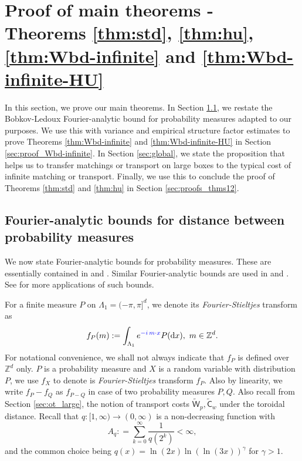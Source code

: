 \documentclass[12pt]{article}
\newcommand{\Z}{\mathbb{Z}}
\newcommand{\1}{\mathbf{1}}
\newcommand{\md}{\mathrm{d}}
\newcommand{\dy}[1]{\textcolor{blue}{#1}}
\newcommand{\dy}[1]{#1}%
\begin{document}
{{{{\section{Proof of main theorems - Theorems \ref{thm:std}, \ref{thm:hu}, \ref{thm:Wbd-infinite} and \ref{thm:Wbd-infinite-HU}}
\label{sec:proofs}

{In this section, we prove our main theorems. In Section \ref{sec:fourierprobbounds}, we restate the Bobkov-Ledoux Fourier-analytic bound for probability measures adapted to our purposes. We use this with variance and empirical structure factor estimates to prove Theorems \ref{thm:Wbd-infinite} and \ref{thm:Wbd-infinite-HU} in Section \ref{sec:proof_Wbd-infinite}. In Section \ref{sec:global}, we state the proposition that helps us to transfer matchings or transport on large boxes to the typical cost of infinite matching or transport. Finally, we use this to conclude the proof of Theorems \ref{thm:std} and \ref{thm:hu} in Section \ref{sec:proofs_thms12}.}

 \subsection{Fourier-analytic bounds for distance between probability measures}
 \label{sec:fourierprobbounds}
%
We now state Fourier-analytic bounds for probability measures. These are essentially contained in \cite[Proposition 2]{bobkov2021simple} and \cite[Theorem 1.1]{bobkov2020transport}. Similar Fourier-analytic bounds are used in \cite{brown2020wasserstein} and \cite{borda2021empirical}. See \cite{steinerberger2021wasserstein} for more applications of such bounds.

For a finite measure $P$ on {$\Lambda _{1} =  (-\pi,\pi]^{d}$}, we denote its {\it Fourier-Stieltjes} transform as {
%
$$ f_{P}(m) := \int_{\Lambda _{1}}e^{\dy{-i\, m \cdot x}}P (\md x), \, \, m \in \Z^d.$$
%
For notational convenience, we shall not always indicate that $f_P$ is defined over $\Z^d$ only.}  {$P$ is a probability measure and} $X$ is a random variable with distribution $P$, we use $f_X$ to denote is {\it Fourier-Stieltjes} transform $f_P$. {Also by linearity, we write $f_{P} - f_Q$ as $f_{P-Q}$ in case of two probability measures $P,Q$. Also recall from Section \ref{sec:ot_large}, the notion of transport costs $\widetilde{\mathsf W}_p,\widetilde{\mathsf C}_{w}$ under the toroidal distance.} {Recall that $q : [1,\infty) \to (0,\infty)$ is a non-decreasing function with
%
$$A_{q}: = \sum_{k=0}^{\infty}\frac{1}{q(2^k)} < \infty,$$
%
and the common choice being $q(x) = \ln(2x)\ln(\ln(3x))^{\gamma}$ for $\gamma > 1$.}

}}}}
\end{document}
